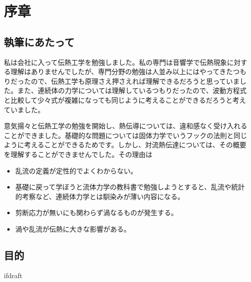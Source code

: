 \documentclass[a4paper]{article}
\begin{document}
\fi

\section{序章}
\subsection{執筆にあたって}

私は会社に入って伝熱工学を勉強しました。私の専門は音響学で伝熱現象に対する理解はありませんでしたが、専門分野の勉強は人並み以上にはやってきたつもりだったので、伝熱工学も原理さえ押さえれば理解できるだろうと思っていました。また、連続体の力学については理解しているつもりだったので、波動方程式と比較して少々式が複雑になっても同じように考えることができるだろうと考えていました。

意気揚々と伝熱工学の勉強を開始し、熱伝導については、違和感なく受け入れることができました。基礎的な問題については固体力学でいうフックの法則と同じように考えることができるためです。しかし、対流熱伝達については、その概要を理解することができませんでした。その理由は

\begin{itemize}
	\item 乱流の定義が定性的でよくわからない。
	\item 基礎に戻って学ぼうと流体力学の教科書で勉強しようとすると、乱流や統計的考察など、連続体力学とは馴染みが薄い内容になる。
	\item 剪断応力が無いにも関わらず渦なるものが発生する。
	\item 渦や乱流が伝熱に大きな影響がある。
\end{itemize}


\subsection{目的}


\expandafter\ifx\csname ifdraft\endcsname\relax
	
\end{document}

